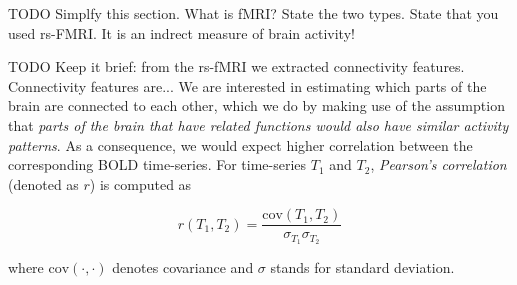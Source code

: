 TODO Simplfy this section. What is fMRI? State the two types. State that you used rs-FMRI. It is an indrect measure of brain activity!



TODO Keep it brief: from the rs-fMRI we extracted connectivity features. Connectivity features are...
We are interested in estimating which parts of the brain are connected to each other, which we do by making use of the assumption that \textit{parts of the brain that have related functions would also have similar activity patterns}. As a consequence, we would expect higher correlation between the corresponding BOLD time-series. For time-series $T_1$ and $T_2$, \textit{Pearson's correlation} (denoted as $r$) is computed as

\begin{equation}
    r(T_1, T_2) = \frac{\mathrm{cov}(T_1, T_2)}{\sigma_{T_1} \sigma_{T_2}}
\end{equation}

where $\mathrm{cov}(\cdot, \cdot)$ denotes covariance and $\sigma$ stands for standard deviation.



